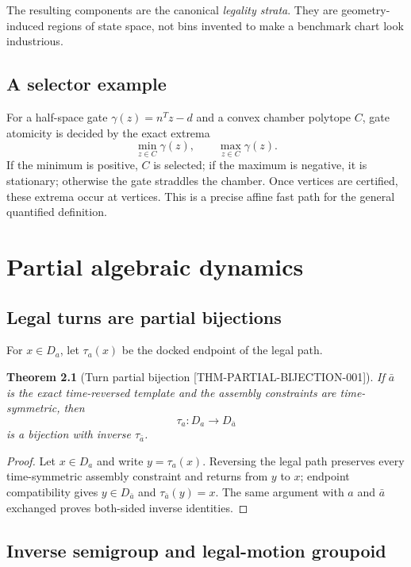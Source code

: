 \documentclass[11pt,openany]{book}
\newcommand{\claimid}[1]{\textnormal{\sffamily\footnotesize[#1]}}
\theoremstyle{polyplain}
\newtheorem{theorem}{Theorem}[chapter]
\theoremstyle{polydef}
\begin{document}
The resulting components are the canonical \emph{legality strata}. They are geometry-induced regions of state space, not bins invented to make a benchmark chart look industrious.

\section{A selector example}

For a half-space gate $\gamma(z)=n^Tz-d$ and a convex chamber polytope $C$, gate atomicity is decided by the exact extrema
\[
\min_{z\in C}\gamma(z),\qquad \max_{z\in C}\gamma(z).
\]
If the minimum is positive, $C$ is selected; if the maximum is negative, it is stationary; otherwise the gate straddles the chamber. Once vertices are certified, these extrema occur at vertices. This is a precise affine fast path for the general quantified definition.

\chapter{Partial algebraic dynamics}
\label{chap:partial-dynamics}

\section{Legal turns are partial bijections}

For $x\in D_a$, let $\tau_a(x)$ be the docked endpoint of the legal path.

\begin{theorem}[Turn partial bijection \claimid{THM-PARTIAL-BIJECTION-001}]
\label{thm:turn-partial-bijection}
If $\bar a$ is the exact time-reversed template and the assembly constraints are time-symmetric, then
\[
\tau_a:D_a\longrightarrow D_{\bar a}
\]
is a bijection with inverse $\tau_{\bar a}$.
\end{theorem}

\begin{proof}
Let $x\in D_a$ and write $y=\tau_a(x)$. Reversing the legal path preserves every time-symmetric assembly constraint and returns from $y$ to $x$; endpoint compatibility gives $y\in D_{\bar a}$ and $\tau_{\bar a}(y)=x$. The same argument with $a$ and $\bar a$ exchanged proves both-sided inverse identities.
\end{proof}

\section{Inverse semigroup and legal-motion groupoid}
\label{sec:partial-dynamics}
\end{document}
